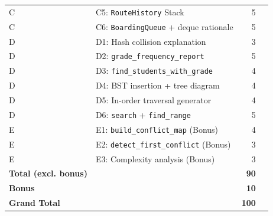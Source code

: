 \documentclass[11pt,a4paper]{article}
\begin{document}
\begin{table}[h!]
\begin{tabular}{llrr}
        C & C5: \texttt{RouteHistory} Stack                & 5  & \underline{\hspace{1cm}} \\
        C & C6: \texttt{BoardingQueue} + deque rationale   & 5  & \underline{\hspace{1cm}} \\
        \midrule
        D & D1: Hash collision explanation                 & 3  & \underline{\hspace{1cm}} \\
        D & D2: \texttt{grade\_frequency\_report}          & 5  & \underline{\hspace{1cm}} \\
        D & D3: \texttt{find\_students\_with\_grade}       & 4  & \underline{\hspace{1cm}} \\
        D & D4: BST insertion + tree diagram               & 4  & \underline{\hspace{1cm}} \\
        D & D5: In-order traversal generator               & 4  & \underline{\hspace{1cm}} \\
        D & D6: \texttt{search} + \texttt{find\_range}     & 5  & \underline{\hspace{1cm}} \\
        \midrule
        E & E1: \texttt{build\_conflict\_map} (Bonus)      & 4  & \underline{\hspace{1cm}} \\
        E & E2: \texttt{detect\_first\_conflict} (Bonus)   & 3  & \underline{\hspace{1cm}} \\
        E & E3: Complexity analysis (Bonus)                & 3  & \underline{\hspace{1cm}} \\
        \midrule
        \textbf{Total (excl. bonus)} & & \textbf{90} & \underline{\hspace{1cm}} \\
        \textbf{Bonus}               & & \textbf{10} & \underline{\hspace{1cm}} \\
        \textbf{Grand Total}         & & \textbf{100} & \underline{\hspace{1cm}} \\
        \bottomrule
    \end{tabular}
\end{table}
\end{document}
